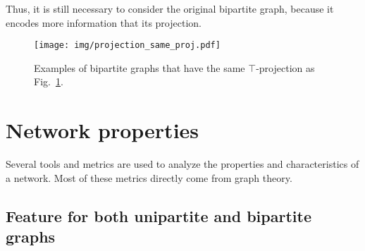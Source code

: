 \documentclass[table]{report}
\begin{document}
Thus, it is still necessary to consider the original bipartite graph, because it encodes more information that its projection. 


\begin{figure}[h]%
\centering
\texttt{[image: img/projection\_same\_proj.pdf]}
\caption{Examples of bipartite graphs that have the same $\top$-projection as Fig.~\ref{fig:projection_example}.}
\label{fig:projection_example}
\end{figure}
\FloatBarrier

%
%
%
%
%

\section{Network properties}

Several tools and metrics are used to analyze the properties and characteristics of a network. Most of these metrics directly come from graph theory. 

\subsection{Feature for both unipartite and bipartite graphs}
\end{document}
